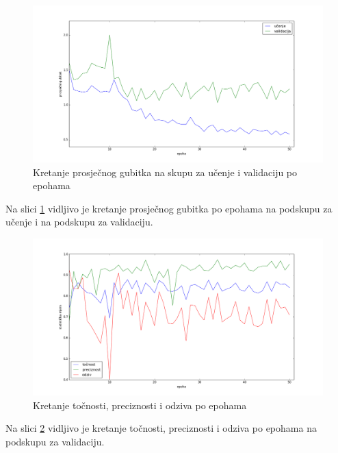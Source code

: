 \documentclass[times, utf8, diplomski, numeric]{fer}
\begin{document}
\begin{figure}[H]
\centering
\includegraphics[scale=0.35]{images/single_irap_loss.png}
\caption{Kretanje prosječnog gubitka na skupu za učenje i validaciju po epohama}
\label{img:single_irap_loss}
\end{figure}
\noindent Na slici \ref{img:single_irap_loss} vidljivo je kretanje prosječnog gubitka po epohama na podskupu za učenje i na podskupu za validaciju.

\begin{figure}[H]
\centering
\includegraphics[scale=0.35]{images/single_irap_ac_ap.png}
\caption{Kretanje točnosti, preciznosti i odziva po epohama}
\label{img:single_irap_ac_ap}
\end{figure}
\noindent Na slici \ref{img:single_irap_ac_ap} vidljivo je kretanje točnosti, preciznosti i odziva po epohama na podskupu za validaciju.
\end{document}
